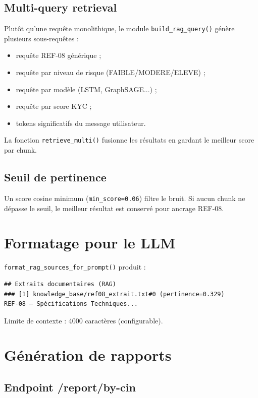 \subsection{Multi-query retrieval}

Plutôt qu'une requête monolithique, le module \texttt{build\_rag\_query()} génère plusieurs sous-requêtes :
\begin{itemize}[leftmargin=*]
  \item requête REF-08 générique ;
  \item requête par niveau de risque (FAIBLE/MODERE/ELEVE) ;
  \item requête par modèle (LSTM, GraphSAGE...) ;
  \item requête par score KYC ;
  \item tokens significatifs du message utilisateur.
\end{itemize}

La fonction \texttt{retrieve\_multi()} fusionne les résultats en gardant le meilleur score par chunk.

\subsection{Seuil de pertinence}

Un score cosine minimum (\texttt{min\_score=0.06}) filtre le bruit. Si aucun chunk ne dépasse le seuil, le meilleur résultat est conservé pour ancrage REF-08.

\section{Formatage pour le LLM}

\texttt{format\_rag\_sources\_for\_prompt()} produit :
\begin{lstlisting}[caption={Exemple extrait RAG injecté au LLM}]
## Extraits documentaires (RAG)
### [1] knowledge_base/ref08_extrait.txt#0 (pertinence=0.329)
REF-08 — Spécifications Techniques...
\end{lstlisting}

Limite de contexte : 4000 caractères (configurable).

\section{Génération de rapports}

\subsection{Endpoint /report/by-cin}


